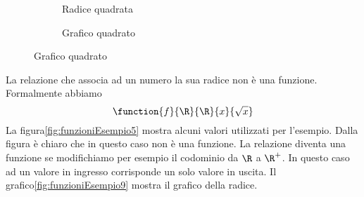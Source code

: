 \begin{figure}
	\centering
	\begin{subfigure}[b]{.4\linewidth}
		\centering
		
		\caption{Radice quadrata}
		\label{fig:funzioniEsempio9}
	\end{subfigure}\qquad
	\centering
	\begin{subfigure}[b]{.4\linewidth}
		\centering
		
		\caption{Grafico quadrato}
		\label{fig:funzioniEsempio8}
	\end{subfigure}%
\end{figure}
\begin{osservazionet}{}{}
	La relazione che associa ad un numero la sua radice non è una funzione. Formalmente abbiamo \[\function{f}{\R}{\R}{x}{\sqrt{x}} \] La figura\nobs\vref{fig:funzioniEsempio5} mostra alcuni valori utilizzati per l'esempio. Dalla figura è chiaro che in questo caso non è una funzione. La relazione diventa una funzione se modifichiamo per esempio il codominio da $\R$ a $\R^{+}$. In questo caso ad un valore in ingresso corrisponde un solo valore in uscita. Il grafico\nobs\vref{fig:funzioniEsempio9} mostra il grafico della radice. 
\end{osservazionet}
